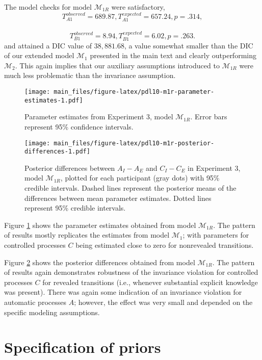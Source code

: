 \documentclass[english,,man]{apa6}
\begin{document}
\begin{appendix}
The model checks for model \(\mathcal{M}_{1R}\) were satisfactory,
\[T_{A1}^{observed} = 689.87, T_{A1}^{expected} = 657.24, p = .314,\]~
\[T_{B1}^{observed} = 8.94, T_{B1}^{expected} = 6.02, p = .263.\] and
attained a DIC value of \(38{,}881.68\), a value somewhat smaller than
the DIC of our extended model \(\mathcal{M}_{1}\) presented in the main
text and clearly outperforming \(\mathcal{M}_2\). This again implies
that our auxiliary assumptions introduced to \(\mathcal{M}_{1R}\) were
much less problematic than the invariance assumption.

\begin{figure}
\centering
\texttt{[image: main\_files/figure-latex/pdl10-m1r-parameter-estimates-1.pdf]}
\caption{\label{fig:pdl10-m1r-parameter-estimates}Parameter estimates from
Experiment 3, model \(\mathcal{M}_{1R}\). Error bars represent 95\%
confidence intervals.}
\end{figure}

\begin{figure}
\centering
\texttt{[image: main\_files/figure-latex/pdl10-m1r-posterior-differences-1.pdf]}
\caption{\label{fig:pdl10-m1r-posterior-differences}Posterior differences
between \(A_I - A_E\) and \(C_I - C_E\) in Experiment 3, model
\(\mathcal{M}_{1R}\), plotted for each participant (gray dots) with 95\%
credible intervals. Dashed lines represent the posterior means of the
differences between mean parameter estimates. Dotted lines represent
95\% credible intervals.}
\end{figure}

Figure \ref{fig:pdl10-m1r-parameter-estimates} shows the parameter
estimates obtained from model \(\mathcal{M}_{1R}\). The pattern of
results mostly replicates the estimates from model \(\mathcal{M}_1\);
with parameters for controlled processes \(C\) being estimated close to
zero for nonrevealed transitions.

Figure \ref{fig:pdl10-m1r-posterior-differences} shows the posterior
differences obtained from model \(\mathcal{M}_{1R}\). The pattern of
results again demonstrates robustness of the invariance violation for
controlled processes \(C\) for revealed transitions (i.e., whenever
substantial explicit knowledge was present). There was again some
indication of an invariance violation for automatic processes \(A\);
however, the effect was very small and depended on the specific modeling
assumptions.

\hypertarget{specification-of-priors}{%
\section{Specification of priors}\label{specification-of-priors}}


\end{appendix}
\end{document}
